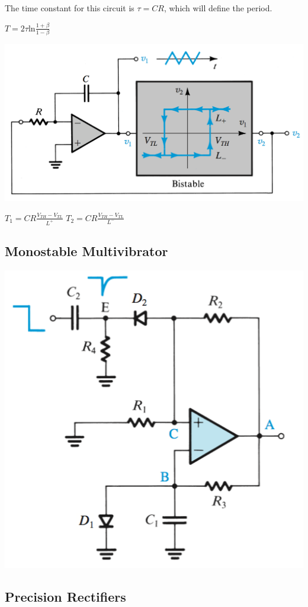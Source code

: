 \documentclass[11pt]{article}
\begin{document}
    The time constant for this circuit is $\tau = CR$, which will define the period.

    \begin{center}
        $T = 2\tau \text{ln}\frac{1+\beta}{1-\beta}$
    \end{center}

    \includegraphics[width = 350 px]{triangle}  
    
    \begin{center}
        $T_1 = CR\frac{V_{TH}-V_{TL}}{L^+}$
        $T_2 = CR\frac{V_{TH}-V_{TL}}{L^-}$
    \end{center}

    \subsection{Monostable Multivibrator}

    \begin{center}
        \includegraphics[width = 250 px]{mono}        
    \end{center}

    \subsection{Precision Rectifiers}

    
\end{document}
